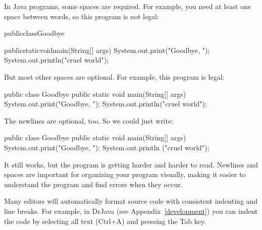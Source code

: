 \documentclass[12pt]{book}
\theoremstyle{exercise}
\begin{document}
In Java programs, some spaces are required.
For example, you need at least one space between words, so this program is not legal:

\begin{code}
publicclassGoodbye{

    publicstaticvoidmain(String[] args) {
        System.out.print("Goodbye, ");
        System.out.println("cruel world");
    }
}
\end{code}

But most other spaces are optional.
For example, this program is legal:

\begin{code}
public class Goodbye {
public static void main(String[] args) {
System.out.print("Goodbye, ");
System.out.println("cruel world");
}
}
\end{code}

The newlines are optional, too.
So we could just write:

\begin{code}
public class Goodbye { public static void main(String[] args)
{ System.out.print("Goodbye, "); System.out.println
("cruel world");}}
\end{code}

It still works, but the program is getting harder and harder to read.
Newlines and spaces are important for organizing your program visually, making it easier to understand the program and find errors when they occur.

Many editors will automatically format source code with consistent indenting and line breaks.
For example, in DrJava (see Appendix~\ref{development}) you can indent the code by selecting all text ({\sf Ctrl+A}) and pressing the {\sf Tab} key.



%

\end{document}
